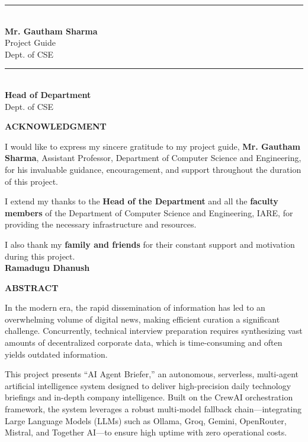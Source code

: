 \documentclass[12pt,a4paper]{report}
\begin{document}
\noindent
\begin{minipage}{0.45\textwidth}
\centering
\rule{5cm}{0.4pt}\\
\textbf{Mr. Gautham Sharma}\\
Project Guide\\
Dept. of CSE
\end{minipage}
\hfill
\begin{minipage}{0.45\textwidth}
\centering
\rule{5cm}{0.4pt}\\
\textbf{Head of Department}\\
Dept. of CSE
\end{minipage}

\newpage
\thispagestyle{empty}
\begin{center}
\textbf{\Large ACKNOWLEDGMENT}\\[1cm]
\end{center}

I would like to express my sincere gratitude to my project guide, \textbf{Mr. Gautham Sharma}, Assistant Professor, Department of Computer Science and Engineering, for his invaluable guidance, encouragement, and support throughout the duration of this project.

I extend my thanks to the \textbf{Head of the Department} and all the \textbf{faculty members} of the Department of Computer Science and Engineering, IARE, for providing the necessary infrastructure and resources.

I also thank my \textbf{family and friends} for their constant support and motivation during this project.\\[2cm]

\hfill \textbf{Ramadugu Dhanush}

\newpage
\thispagestyle{empty}
\begin{center}
\textbf{\Large ABSTRACT}\\[1cm]
\end{center}

In the modern era, the rapid dissemination of information has led to an overwhelming volume of digital news, making efficient curation a significant challenge. Concurrently, technical interview preparation requires synthesizing vast amounts of decentralized corporate data, which is time-consuming and often yields outdated information.

This project presents ``AI Agent Briefer,'' an autonomous, serverless, multi-agent artificial intelligence system designed to deliver high-precision daily technology briefings and in-depth company intelligence. Built on the CrewAI orchestration framework, the system leverages a robust multi-model fallback chain---integrating Large Language Models (LLMs) such as Ollama, Groq, Gemini, OpenRouter, Mistral, and Together AI---to ensure high uptime with zero operational costs.
\end{document}
